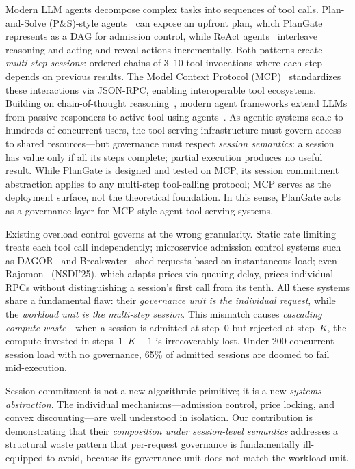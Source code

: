 \documentclass[sigconf,review,anonymous]{acmart}
\begin{document}
Modern LLM agents decompose complex tasks into sequences of tool calls. Plan-and-Solve (P\&S)-style agents~\cite{planandsolve} can expose an upfront plan, which PlanGate represents as a DAG for admission control, while ReAct agents~\cite{react} interleave reasoning and acting and reveal actions incrementally. Both patterns create \emph{multi-step sessions}: ordered chains of 3--10 tool invocations where each step depends on previous results. The Model Context Protocol (MCP)~\cite{mcp2024} standardizes these interactions via JSON-RPC, enabling interoperable tool ecosystems. Building on chain-of-thought reasoning~\cite{cot}, modern agent frameworks extend LLMs from passive responders to active tool-using agents~\cite{llmsurvey}. As agentic systems scale to hundreds of concurrent users, the tool-serving infrastructure must govern access to shared resources---but governance must respect \emph{session semantics}: a session has value only if all its steps complete; partial execution produces no useful result. While PlanGate is designed and tested on MCP, its session commitment abstraction applies to any multi-step tool-calling protocol; MCP serves as the deployment surface, not the theoretical foundation. In this sense, PlanGate acts as a governance layer for MCP-style agent tool-serving systems.


Existing overload control governs at the wrong granularity. Static rate limiting treats each tool call independently; microservice admission control systems such as DAGOR~\cite{dagor} and Breakwater~\cite{breakwater} shed requests based on instantaneous load; even Rajomon~\cite{rajomon2025} (NSDI'25), which adapts prices via queuing delay, prices individual RPCs without distinguishing a session's first call from its tenth. All these systems share a fundamental flaw: their \emph{governance unit is the individual request}, while the \emph{workload unit is the multi-step session}. This mismatch causes \emph{cascading compute waste}---when a session is admitted at step~0 but rejected at step~$K$, the compute invested in steps~$1$--$K{-}1$ is irrecoverably lost. Under 200-concurrent-session load with no governance, 65\% of admitted sessions are doomed to fail mid-execution.

Session commitment is not a new algorithmic primitive; it is a new \emph{systems abstraction}. The individual mechanisms---admission control, price locking, and convex discounting---are well understood in isolation. Our contribution is demonstrating that their \emph{composition under session-level semantics} addresses a structural waste pattern that per-request governance is fundamentally ill-equipped to avoid, because its governance unit does not match the workload unit.
\end{document}
